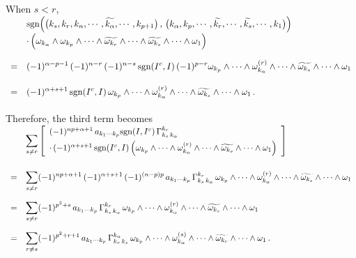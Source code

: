 \documentclass{article}[12pt,a4paper]
\begin{document}
When $s<r$, \\[0.1in]
$\begin{array}{rl} 
& \ds 
	\mbox{sgn}\Big(\big(k_s, k_r, k_n, \cdots, \widetilde{k_\alpha}, \cdots, k_{p+1}\big)\,,\,
	\big(k_\alpha, k_p, \cdots, \widetilde{k_r}, \cdots, \widetilde{k_s}, \cdots, k_1\big)\Big)\\[4pt]
& \ds 
	\cdot\, \Big(\omega_{k_\alpha} \wedge \omega_{k_p} \wedge\cdots\wedge \widetilde{\omega_{k_r}} 
	\wedge\cdots\wedge \widetilde{\omega_{k_s}} \wedge\cdots\wedge \omega_1\Big) \\[0.2in]

=& \ds (-1)^{\alpha-p-1}\, (-1)^{n-r}\, (-1)^{n-s} \, \mbox{sgn}(I^c, I)\, (-1)^{p-r}
	\omega_{k_p} \wedge\cdots\wedge \omega_{k_\alpha}^{(r)} \wedge\cdots\wedge \widetilde{\omega_{k_s}} 
	\wedge\cdots\wedge \omega_1 \\[0.2in]
=& \ds 
	(-1)^{\alpha+s+1} \, \mbox{sgn}(I^c, I)\, 
	\omega_{k_p} \wedge\cdots\wedge \omega_{k_\alpha}^{(r)} \wedge\cdots\wedge \widetilde{\omega_{k_s}} 
	\wedge\cdots\wedge \omega_1 \,.\\[0.2in]
\end{array}$ \\[0.1in]

Therefore, the third term becomes \\[0.1in]
$\begin{array}{rl} 
& \displaystyle \sum_{s\neq r} \left[ \begin{array}{l}
		(-1)^{np+\alpha+1}\, a_{k_1\cdots k_p} \mbox{sgn}(I, I^c)\, \Gamma_{k_s\, k_\alpha}^{k_r} \\[4pt]
		\cdot \,(-1)^{\alpha+s+1} \, \mbox{sgn}(I^c, I) \, 
		\Big( \omega_{k_p} \wedge\cdots\wedge \omega_{k_\alpha}^{(r)} \wedge\cdots\wedge \widetilde{\omega_{k_s}} 
		\wedge\cdots\wedge \omega_1 \Big) 
	\end{array} \right] \\[0.4in]
=& \displaystyle 
	\sum_{s\neq r} (-1)^{np+\alpha+1}\, (-1)^{\alpha+s+1}\, (-1)^{(n-p)p} \,
	a_{k_1\cdots k_p} \, \Gamma_{k_s\, k_\alpha}^{k_r} \, 
	\omega_{k_p} \wedge\cdots\wedge \omega_{k_\alpha}^{(r)} \wedge\cdots\wedge \widetilde{\omega_{k_s}} \wedge\cdots\wedge \omega_1 
	\\[0.3in]
=& \displaystyle 
	\sum_{s\neq r} (-1)^{p^2+s}\, a_{k_1\cdots k_p} \, \Gamma_{k_s\, k_\alpha}^{k_r} \, 
	\omega_{k_p} \wedge\cdots\wedge \omega_{k_\alpha}^{(r)} \wedge\cdots\wedge \widetilde{\omega_{k_s}} \wedge\cdots\wedge \omega_1 \\[0.3in]
=& \displaystyle 
	\sum_{r\neq s} (-1)^{p^2+r +1} \, a_{k_1\cdots k_p} \, \Gamma_{k_r\, k_s}^{k_\alpha} \,
	\omega_{k_p} \wedge\cdots\wedge \omega_{k_\alpha}^{(s)} \wedge\cdots\wedge \widetilde{\omega_{k_r}} \wedge\cdots\wedge \omega_1\,. \\
\end{array}$ \\[0.1in]
\end{document}
